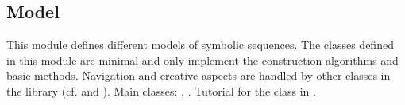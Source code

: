 \documentclass[letterpaper,10pt,english]{sphinxmanual}
\begin{document}
\chapter{}
\label{\detokenize{index:module-Model}}\label{\detokenize{index:models-and-navigation}}

\section{Model}
\label{\detokenize{index:model}}
This module defines different models of symbolic sequences.
The classes defined in this module are minimal and only implement the construction algorithms and basic methods. Navigation and creative aspects are handled by other classes in the library (cf. {\hyperref[\detokenize{index:module-Navigator}]{}} and ).
Main classes: {\hyperref[\detokenize{index:Model.Model}]{}}, {\hyperref[\detokenize{index:Model.FactorOracle}]{}}. 
Tutorial for the class {\hyperref[\detokenize{index:Model.FactorOracle}]{}} in .
\end{document}
